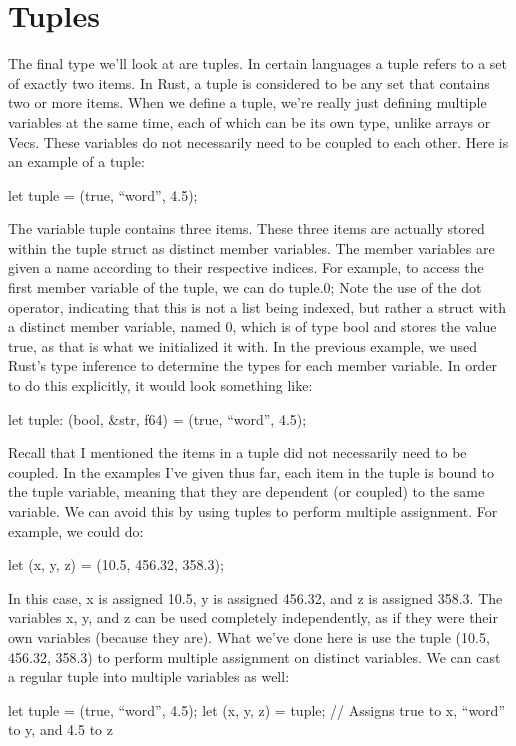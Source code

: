 \documentclass{article}
\begin{document}
\section{Tuples}

The final type we’ll look at are tuples. In certain languages a tuple refers to a set of exactly two 
items. In Rust, a tuple is considered to be any set that contains two or more items. When we define 
a tuple, we’re really just defining multiple variables at the same time, each of which can be its own type, 
unlike arrays or Vecs. These variables do not necessarily need to be coupled to each other. Here is an example 
of a tuple: 

\begin{rustlst}

let tuple = (true, “word”, 4.5); 

\end{rustlst}

The variable tuple contains three items. These three items are actually stored within the tuple struct as 
distinct member variables. The member variables are given a name according to their respective 
indices. For example, to access the first member variable of the tuple, we can do tuple.0; Note the use of 
the dot operator, indicating that this is not a list being indexed, but rather a struct with a distinct member 
variable, named 0, which is of type bool and stores the value true, as that is what we initialized it 
with. In the previous example, we used Rust’s type inference to determine the types for each member variable. 
In order to do this explicitly, it would look something like: 

\begin{rustlst}

let tuple: (bool, &str, f64) = (true, “word”, 4.5); 

\end{rustlst}

Recall that I mentioned the items in a tuple did not necessarily need to be coupled. In the examples I’ve 
given thus far, each item in the tuple is bound to the tuple variable, meaning that they are dependent (or 
coupled) to the same variable. We can avoid this by using tuples to perform multiple assignment. For example, 
we could do: 

\begin{rustlst}

let (x, y, z) = (10.5, 456.32, 358.3); 

\end{rustlst}

In this case, x is assigned 10.5, y is assigned 456.32, and z is assigned 358.3. The variables x, y, and z can 
be used completely independently, as if they were their own variables (because they are). What we’ve done here 
is use the tuple (10.5, 456.32, 358.3) to perform multiple assignment on 
distinct variables. We can cast a regular tuple into multiple variables as well:

\begin{rustlst}

let tuple = (true, “word”, 4.5);
let (x, y, z) = tuple; // Assigns true to x, “word” to y, and 4.5 to z

\end{rustlst}
\end{document}
